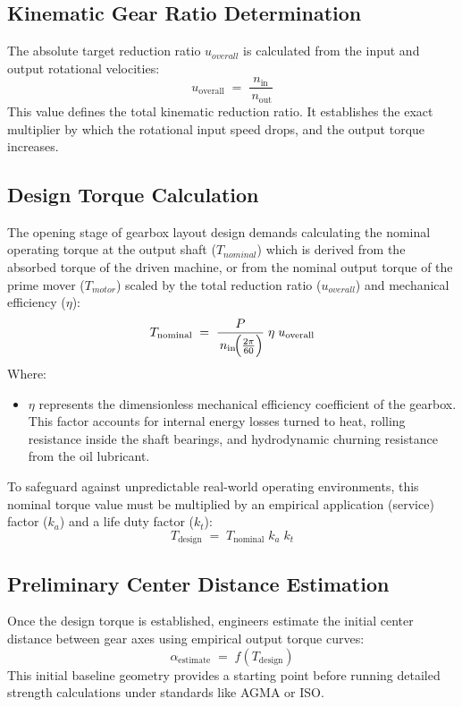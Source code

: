 	\subsection{Kinematic Gear Ratio Determination}
		The absolute target reduction ratio $u_{overall}$ is calculated from the input and output rotational velocities: 
			\begin{equation}
				\label{eq:reductionratio}
				u_{\text{overall}}
				\;=\;
				\frac{n_{\text{in}}}{\,n_{\text{out}}}
			\end{equation}
		This value defines the total kinematic reduction ratio. It establishes the exact multiplier by which the 
		rotational input speed drops, and the output torque increases. 

	\subsection{Design Torque Calculation}
		The opening stage of gearbox layout design demands calculating the nominal operating torque at the 
		output shaft ($T_{nominal}$) which is derived from the absorbed torque of the driven machine, or from the 
		nominal output torque of the prime mover ($T_{motor}$) scaled by the total reduction ratio ($u_{overall}$) 
		and mechanical efficiency ($\eta$):
			\begin{equation}
				\label{eq:nominaltorque}
				T_{\text{nominal}}
				\;=\;
				\frac{P}{\,n_{\text{in}}\!\Bigl(\frac{2\pi}{60}\Bigr)}
				\;\eta\;
				u_{\text{overall}}
			\end{equation}
		Where: 
			\begin{itemize}
				\item \textbf{$\eta$} represents the dimensionless mechanical efficiency coefficient of the gearbox. 
				This factor accounts for internal energy losses turned to heat, rolling resistance inside the shaft 
				bearings, and hydrodynamic churning resistance from the oil lubricant.
			\end{itemize}

		To safeguard against unpredictable real-world operating environments, this nominal torque value must be 
		multiplied by an empirical application (service) factor ($k_{a}$) and a life duty factor ($k_{t}$): 
			\begin{equation}
				\label{eq:designtorque}
				T_{\text{design}}
				\;=\;
				T_{\text{nominal}}\; k_a \; k_t
			\end{equation}

	\subsection{Preliminary Center Distance Estimation}
		Once the design torque is established, engineers estimate the initial center distance between gear axes 
		using empirical output torque curves: 
			\begin{equation}
				\label{eq:aestimate}
				\alpha_{\text{estimate}}  
				\;=\; 
				f(T_{\text{design}})
			\end{equation}
		This initial baseline geometry provides a starting point before running detailed strength calculations 
		under standards like AGMA or ISO.

